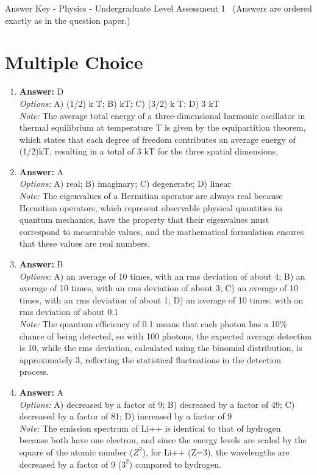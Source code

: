 \documentclass[12pt]{article}
\begin{document}
\begin{center}
Answer Key - Physics - Undergraduate Level Assessment 1 \
\small (Answers are ordered exactly as in the question paper.)
\end{center}

\section*{Multiple Choice}
\begin{enumerate}[label=\arabic*.]
\item \textbf{Answer:} D
\\ \textit{Options:} A) (1/2) k T; B) kT; C) (3/2) k T; D) 3 kT
\\ \textit{Note:} The average total energy of a three-dimensional harmonic oscillator in thermal equilibrium at temperature T is given by the equipartition theorem, which states that each degree of freedom contributes an average energy of (1/2)kT, resulting in a total of 3 kT for the three spatial dimensions.
\item \textbf{Answer:} A
\\ \textit{Options:} A) real; B) imaginary; C) degenerate; D) linear
\\ \textit{Note:} The eigenvalues of a Hermitian operator are always real because Hermitian operators, which represent observable physical quantities in quantum mechanics, have the property that their eigenvalues must correspond to measurable values, and the mathematical formulation ensures that these values are real numbers.
\item \textbf{Answer:} B
\\ \textit{Options:} A) an average of 10 times, with an rms deviation of about 4; B) an average of 10 times, with an rms deviation of about 3; C) an average of 10 times, with an rms deviation of about 1; D) an average of 10 times, with an rms deviation of about 0.1
\\ \textit{Note:} The quantum efficiency of 0.1 means that each photon has a 10\% chance of being detected, so with 100 photons, the expected average detection is 10, while the rms deviation, calculated using the binomial distribution, is approximately 3, reflecting the statistical fluctuations in the detection process.
\item \textbf{Answer:} A
\\ \textit{Options:} A) decreased by a factor of 9; B) decreased by a factor of 49; C) decreased by a factor of 81; D) increased by a factor of 9
\\ \textit{Note:} The emission spectrum of Li++ is identical to that of hydrogen because both have one electron, and since the energy levels are scaled by the square of the atomic number ($Z^2$), for Li++ (Z=3), the wavelengths are decreased by a factor of 9 ($3^2$) compared to hydrogen.

\end{enumerate}
\end{document}
